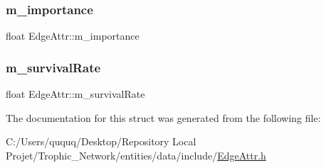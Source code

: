 \subsubsection{\texorpdfstring{m\+\_\+importance}{m\_importance}}
{\footnotesize\ttfamily float Edge\+Attr\+::m\+\_\+importance}

\mbox{\label{struct_edge_attr_ab59fbd7d336f72ac48294c8c7bb9e4ef}} 
\subsubsection{\texorpdfstring{m\+\_\+survival\+Rate}{m\_survivalRate}}
{\footnotesize\ttfamily float Edge\+Attr\+::m\+\_\+survival\+Rate}



The documentation for this struct was generated from the following file\+:\begin{DoxyCompactItemize}
\item 
C\+:/\+Users/ququq/\+Desktop/\+Repository Local Projet/\+Trophic\+\_\+\+Network/entities/data/include/\mbox{\hyperlink{_edge_attr_8h}{Edge\+Attr.\+h}}\end{DoxyCompactItemize}
